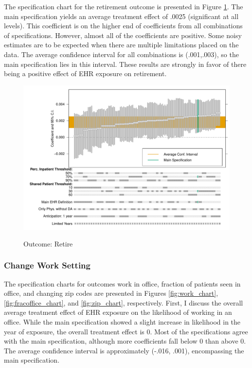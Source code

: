 \documentclass[12pt]{article}
\begin{document}
The specification chart for the retirement outcome is presented in Figure \ref{fig:retire_chart}. The main specification yields an average treatment effect of .0025 (significant at all levels). This coefficient is on the higher end of coefficients from all combinations of specifications. However, almost all of the coefficients are positive. Some noisy estimates are to be expected when there are multiple limitations placed on the data. The average confidence interval for all combinations is (.001,.003), so the main specification lies in this interval. These results are strongly in favor of there being a positive effect of EHR exposure on retirement. 

\begin{figure}[ht]
    \centering
    \caption{Outcome: Retire}
    \includegraphics[scale=.6]{Objects/retire_chart.pdf}
    \label{fig:retire_chart}
\end{figure}

\subsubsection{Change Work Setting}

The specification charts for outcomes work in office, fraction of patients seen in office, and changing zip codes are presented in Figures \ref{fig:work_chart}, \ref{fig:fracoffice_chart}, and \ref{fig:zip_chart}, respectively. First, I discuss the overall average treatment effect of EHR exposure on the likelihood of working in an office. While the main specification showed a slight increase in likelihood in the year of exposure, the overall treatment effect is 0. Most of the specifications agree with the main specification, although more coefficients fall below 0 than above 0. The average confidence interval is approximately (-.016, .001), encompassing the main specification.  
\end{document}

